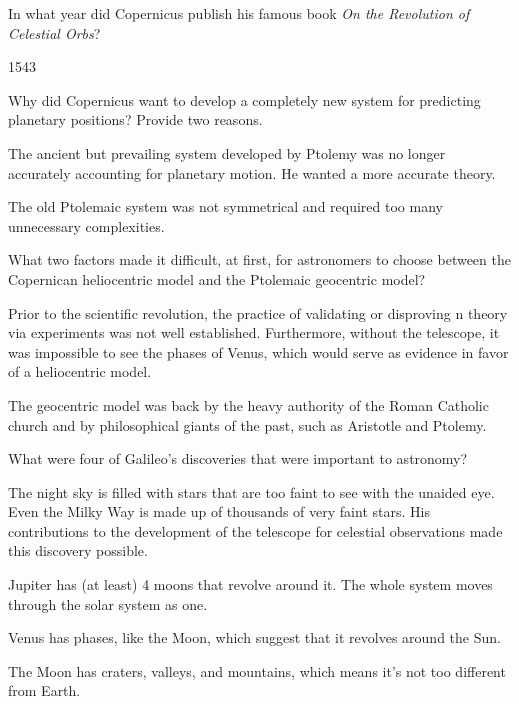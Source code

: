 \documentclass[addpoints]{exam}
\begin{document}
\begin{questions}
\question
In what year did Copernicus publish his famous book \textit{On the Revolution of Celestial Orbs}?

\begin{solution}
    1543
\end{solution}

\question %
Why did Copernicus want to develop a completely new system for predicting planetary positions? Provide two reasons.

\begin{solution}
    The ancient but prevailing system developed by Ptolemy was no longer accurately accounting for planetary motion. He wanted a more accurate theory. 

    The old Ptolemaic system was not symmetrical and required too many unnecessary complexities. 
\end{solution}

\question %
What two factors made it difficult, at first, for astronomers to choose between the Copernican heliocentric model and the Ptolemaic geocentric model?

\begin{solution}
    Prior to the scientific revolution, the practice of validating or disproving n theory via experiments was not well established. Furthermore, without the telescope, it was impossible to see the phases of Venus, which would serve as evidence in favor of a heliocentric model.

    The geocentric model was back by the heavy authority of the Roman Catholic church and by philosophical giants of the past, such as Aristotle and Ptolemy. 
\end{solution}

\question %
What were four of Galileo's discoveries that were important to astronomy?

\begin{solution}
    The night sky is filled with stars that are too faint to see with the unaided eye. Even the Milky Way is made up of thousands of very faint stars. His contributions to the development of the telescope for celestial observations made this discovery possible.
    
    Jupiter has (at least) 4 moons that revolve around it. The whole system moves through the solar system as one.

    Venus has phases, like the Moon, which suggest that it revolves around the Sun.

    The Moon has craters, valleys, and mountains, which means it's not too different from Earth.
\end{solution}


\end{questions}
\end{document}
